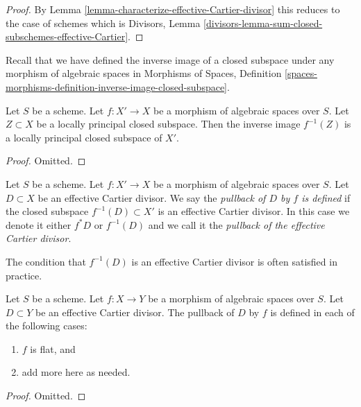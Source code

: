 \begin{proof}
By Lemma \ref{lemma-characterize-effective-Cartier-divisor}
this reduces to the case of schemes which is
Divisors, Lemma \ref{divisors-lemma-sum-closed-subschemes-effective-Cartier}.
\end{proof}

\noindent
Recall that we have defined the inverse image of a closed subspace
under any morphism of algebraic spaces in
Morphisms of Spaces, Definition
\ref{spaces-morphisms-definition-inverse-image-closed-subspace}.

\begin{lemma}
\label{lemma-pullback-locally-principal}
Let $S$ be a scheme.
Let $f : X' \to X$ be a morphism of algebraic spaces over $S$.
Let $Z \subset X$ be a locally principal closed subspace.
Then the inverse image $f^{-1}(Z)$ is a locally principal closed
subspace of $X'$.
\end{lemma}

\begin{proof}
Omitted.
\end{proof}

\begin{definition}
\label{definition-pullback-effective-Cartier-divisor}
Let $S$ be a scheme.
Let $f : X' \to X$ be a morphism of algebraic spaces over $S$.
Let $D \subset X$
be an effective Cartier divisor. We say the {\it pullback of
$D$ by $f$ is defined} if the closed subspace $f^{-1}(D) \subset X'$
is an effective Cartier divisor. In this case we denote it either
$f^*D$ or $f^{-1}(D)$ and we call it the
{\it pullback of the effective Cartier divisor}.
\end{definition}

\noindent
The condition that $f^{-1}(D)$ is an effective Cartier divisor
is often satisfied in practice.

\begin{lemma}
\label{lemma-pullback-effective-Cartier-defined}
Let $S$ be a scheme.
Let $f : X \to Y$ be a morphism of algebraic spaces over $S$.
Let $D \subset Y$ be an effective Cartier divisor.
The pullback of $D$ by $f$ is defined in each of the following cases:
\begin{enumerate}
\item $f$ is flat, and
\item add more here as needed.
\end{enumerate}
\end{lemma}

\begin{proof}
Omitted.
\end{proof}

